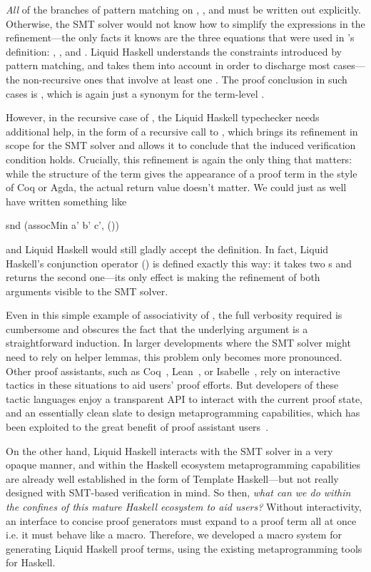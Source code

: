 {\em All} of the branches of pattern matching on , , and
 must be written out explicitly. Otherwise, the SMT solver would
not know how to simplify the  expressions in the
refinement---the only facts it knows are the three equations that were
used in 's definition:
%
, , and
%
.
%
Liquid Haskell understands the constraints introduced by pattern
matching, and takes them into account in order to discharge most
cases---the non-recursive ones that involve at least one . The
proof conclusion in such cases is , which is again just a
synonym for the term-level \LC{()}.

However, in the recursive case of , the Liquid Haskell typechecker needs
additional help, in the form of a recursive call to , which
brings its refinement in scope for the SMT solver and allows it to conclude that
the induced verification condition holds. Crucially, this refinement is again the
only thing that matters: while the structure of the term gives the appearance
of a proof term in the style of Coq or Agda, the actual return value doesn't matter.
We could just as well have written something like
\begin{code}
  snd (assocMin a' b' c', ())
\end{code}
and Liquid Haskell would still gladly accept the definition. In fact,
Liquid Haskell's conjunction operator (\LC{&&&}) is defined exactly
this way: it takes two s and returns the second one---its
only effect is making the refinement of both arguments visible to the SMT solver.

Even in this simple example of associativity of , the full
verbosity required is cumbersome and obscures the fact that the
underlying argument is a straightforward induction. In larger
developments where the SMT solver might need to rely on helper lemmas,
this problem only becomes more pronounced.  Other proof assistants,
such as Coq~\cite{Coq}, Lean~\cite{Lean4}, or
Isabelle~\cite{Isabelle}, rely on interactive tactics in these
situations to aid users' proof efforts. But developers of these tactic
languages enjoy a transparent API to interact with the current proof
state, and an essentially clean slate to design metaprogramming
capabilities, which has been exploited to the great benefit of proof
assistant users~\cite{Ltac, Mtac, ltac2}.

On the other hand, Liquid Haskell interacts with the SMT solver in a
very opaque manner, and within the Haskell ecosystem metaprogramming
capabilities are already well established in the form of Template
Haskell---but not really designed with SMT-based verification in
mind. So then, {\em what can we do within the confines of this mature
  Haskell ecosystem to aid users?}  Without interactivity, an
interface to concise proof generators must expand to a proof term all
at once i.e. it must behave like a macro. Therefore, we developed a
macro system for generating Liquid Haskell proof terms, using the
existing metaprogramming tools for Haskell.

